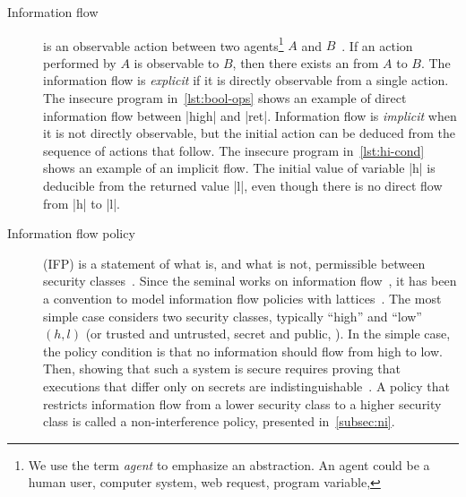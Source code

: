 \begin{description}

\item[Information flow]
is an observable action between two agents\footnote{ We use the term
\emph{agent} to emphasize an abstraction. An agent could be a human user,
computer system, web request, program variable, \etc} \({A}\) and
\({B}\)~\cite{eggert2014}.
If an action performed by \({A}\) is observable to \({B}\),
then there exists an  from \({A}\) to \({B}\).
The information flow is \emph{explicit} 
if it is directly observable from a single action.
The insecure program in~\autoref{lst:bool-ops} shows an example of direct information flow between \pr|high| and \pr|ret|.
Information flow is \emph{implicit} 
when it is not directly observable, but the initial action can be deduced from the sequence of actions that follow.
The insecure program in~\autoref{lst:hi-cond} shows an example of an implicit flow.
The initial value of variable \pr|h| is deducible from the returned value \pr|l|, even though there is no direct flow from \pr|h| to \pr|l|.

\item[Information flow policy] (IFP)
is a statement of what is, and what is not, permissible between security classes~\cite[p. 9]{bishop2003}.
Since the seminal works on information flow~\cite{biba1977,bell1976}, it has been a convention to model information flow policies with lattices~\cite{denning76}.
The most simple case considers two security classes, 
typically \enquote{high} and \enquote{low} \(({h}, {l})\) (or trusted and untrusted, secret and public, \etc).
In the simple case, the policy condition is that no information should flow from high to low.~\cite{bossi2005}
Then, showing that such a system is secure requires proving that executions that differ only on secrets are indistinguishable~\cite{piessens2024}.
A policy that restricts information flow from a lower security class to a higher security class is called a
{non-interference policy}, presented in~\autoref{subsec:ni}.


\end{description}
